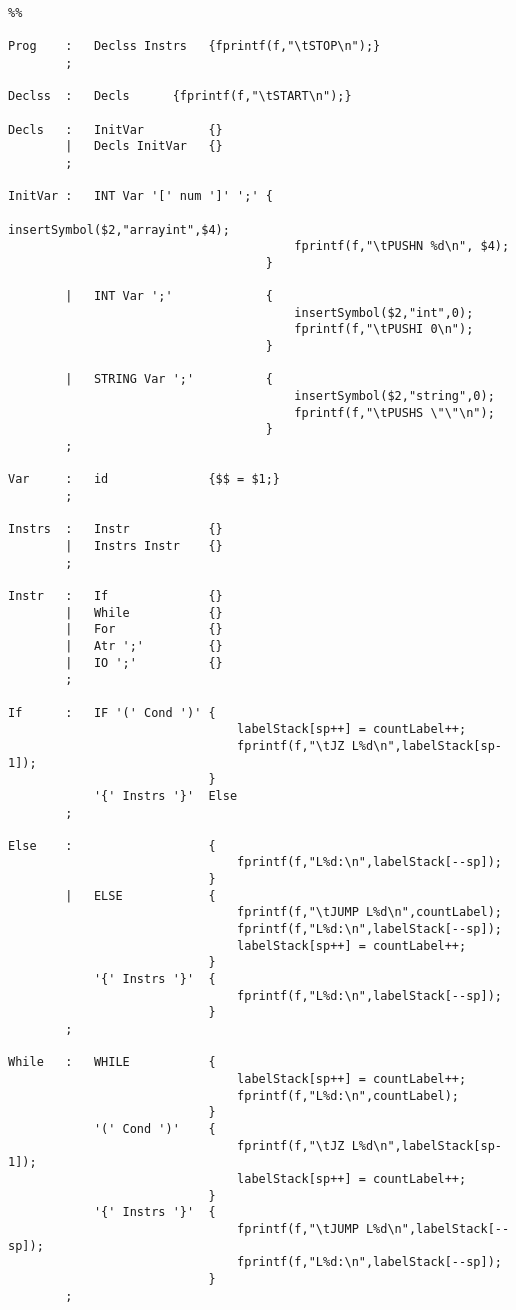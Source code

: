 \documentclass{report}
\begin{document}
\begin{verbatim}
%%

Prog    :   Declss Instrs   {fprintf(f,"\tSTOP\n");}
        ;

Declss  :   Decls      {fprintf(f,"\tSTART\n");}

Decls   :   InitVar         {}
        |   Decls InitVar   {}
        ;

InitVar :   INT Var '[' num ']' ';' {
                                        insertSymbol($2,"arrayint",$4);
                                        fprintf(f,"\tPUSHN %d\n", $4);
                                    }
                                        
        |   INT Var ';'             {
                                        insertSymbol($2,"int",0);
                                        fprintf(f,"\tPUSHI 0\n");
                                    }

        |   STRING Var ';'          {
                                        insertSymbol($2,"string",0);
                                        fprintf(f,"\tPUSHS \"\"\n");
                                    }
        ;

Var     :   id              {$$ = $1;}
        ;

Instrs  :   Instr           {}
        |   Instrs Instr    {}
        ;    

Instr   :   If              {}
        |   While           {}
        |   For             {}
        |   Atr ';'         {}
        |   IO ';'          {}
        ;

If      :   IF '(' Cond ')' {
                                labelStack[sp++] = countLabel++;
                                fprintf(f,"\tJZ L%d\n",labelStack[sp-1]);
                            }
            '{' Instrs '}'  Else
        ;

Else    :                   {    
                                fprintf(f,"L%d:\n",labelStack[--sp]);
                            }
        |   ELSE            {
                                fprintf(f,"\tJUMP L%d\n",countLabel);
                                fprintf(f,"L%d:\n",labelStack[--sp]);
                                labelStack[sp++] = countLabel++;
                            } 
            '{' Instrs '}'  {
                                fprintf(f,"L%d:\n",labelStack[--sp]);
                            }
        ;

While   :   WHILE           {
                                labelStack[sp++] = countLabel++;
                                fprintf(f,"L%d:\n",countLabel);
                            }
            '(' Cond ')'    {
                                fprintf(f,"\tJZ L%d\n",labelStack[sp-1]);
                                labelStack[sp++] = countLabel++;
                            }
            '{' Instrs '}'  {
                                fprintf(f,"\tJUMP L%d\n",labelStack[--sp]);
                                fprintf(f,"L%d:\n",labelStack[--sp]);
                            }
        ;


\end{verbatim}
\end{document}
